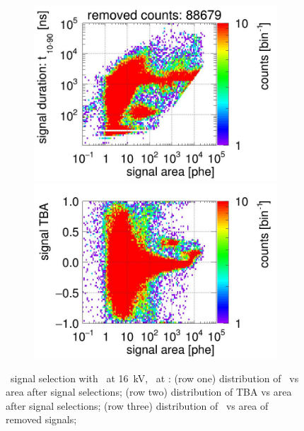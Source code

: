 \begin{landscape}
\begin{figure}[!p]
\begin{subfigure}[t]{0.32\textwidth}
			\includegraphics[width=\figurewidth,clip,trim={0 98 0 15}]{Figures/GasTest/CutsValid/res64771/pdpaX29Vecfig64771.jpg}
			\includegraphics[width=\figurewidth,clip,trim={0 8 0 40}]{Figures/GasTest/CutsValid/res64771/tbapaX29Vecfig64771.jpg}
			\caption{}
			\label{fig:signal selection dv 16 04}
		\end{subfigure}
		\caption[\gtest\ signal selection with \opdv\ at \SI{16}{\kV}, \opgd\ at \standarddensity .]{\gtest\ signal selection with \opdv\ at \SI{16}{\kV}, \opgd\ at \standarddensity : 
			(row one) distribution of \rpdshort\ vs area after signal selections;
			(row two) distribution of TBA vs area after signal selections;
			(row three) distribution of \rpdshort\ vs area of removed signals;
}
\end{figure}
\end{landscape}
